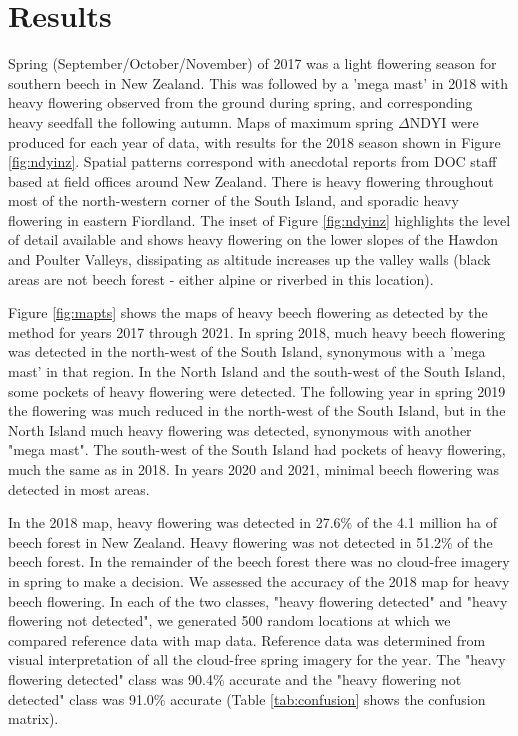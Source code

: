 \documentclass[remotesensing,article,submit,moreauthors,pdftex]{Definitions/mdpi}
\begin{document}

\section{Results}

Spring (September/October/November) of 2017 was a light flowering season for southern beech in New Zealand. This was
followed by a 'mega mast' in 2018 with heavy flowering observed from the ground during spring, and corresponding heavy
seedfall the following autumn. Maps of maximum spring $\Delta\text{NDYI}$ were produced for each year of data, with results
for the 2018 season shown in Figure \ref{fig:ndyinz}. Spatial patterns correspond with anecdotal reports from
DOC staff based at field offices around New Zealand. There is heavy flowering throughout most of the north-western corner of the South Island, and
sporadic heavy flowering in eastern Fiordland. The inset of Figure \ref{fig:ndyinz} highlights the level of detail available and shows heavy flowering on the lower slopes of the Hawdon and Poulter Valleys, dissipating as altitude increases up the valley walls (black areas are not beech forest - either alpine or riverbed in this location).

Figure \ref{fig:mapts} shows the maps of heavy beech flowering as detected by the method for years 2017 through 2021. In spring 2018, much heavy beech flowering was detected in the north-west of the South Island, synonymous with a 'mega mast' in that region. In the North Island and the south-west of the South Island, some pockets of heavy flowering were detected. The following year in spring 2019 the flowering was much reduced in the north-west of the South Island, but in the North Island much heavy flowering was detected, synonymous with another "mega mast". The south-west of the South Island had pockets of heavy flowering, much the same as in 2018. In years 2020 and 2021, minimal beech flowering was detected in most areas. 

In the 2018 map, heavy flowering was detected in 27.6\% of the 4.1 million ha of beech forest in New Zealand. Heavy flowering was not detected in 51.2\% of the beech forest. In the remainder of the beech forest there was no cloud-free imagery in spring to make a decision. We assessed the accuracy of the 2018 map for heavy beech flowering. In each of the two classes, "heavy flowering detected" and "heavy flowering not detected", we generated 500 random locations at which we compared reference data with map data. Reference data was determined from visual interpretation of all the cloud-free spring imagery for the year. The "heavy flowering detected" class was 90.4\% accurate and the "heavy flowering not detected" class was 91.0\% accurate (Table \ref{tab:confusion} shows the confusion matrix).  
\end{document}
